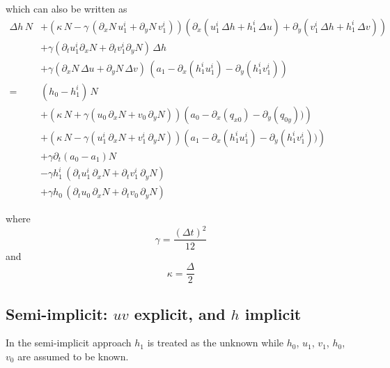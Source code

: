 \documentclass[10pt,a4paper]{book}
\newcommand{\p}{\partial}
\begin{document}
which can also be written as
\begin{align*}
\Delta h  \, N &+ 
\left (\kappa \,N - \gamma \,(\p_x N \, u^i_1    +\p_y N \, v^i_1 ) \right ) 
\left ( \p_x(u^i_1 \, \Delta h  + h^i_1 \,\Delta u ) + \p_y (v^i_1 \, \Delta h  + h^i_1 \,\Delta v ) \right ) \\
&+ \gamma (\p_t u^i_1 \p_x N +\p_t v^i_1 \p_y N ) \, \Delta h  \\
&+  \gamma (\p_x N \, \Delta u+\p_y N \, \Delta v) \, (a_1- \p_x (h^i_1 u^i_1) -\p_y (h^i_1 v^i_1))  \\
=&  ( h_0-h^i_1) \, N \\
&+ \left (\kappa \, N+ \gamma(u_0 \, \p_x N + v_0 \, \p_y N) \right )   \left ( a_0 -\p_x(q_{x0})- \p_y(q_{0y}))  \right ) \\
&+ \left (\kappa\, N-\gamma (u^i_1 \, \p_x N + v^i_1 \, \p_y N) \right ) \left ( a_1 -\p_x(h^i_1 u^i_1) -\p_y(h^i_1 v^i_1))  \right ) \\
&+ \gamma \p_t (a_0-a_1) N \\
&- \gamma h^i_1 \, (\p_t u^i_1 \, \p_x N + \p_t v^i_1 \, \p_y N)  \\
&+ \gamma h_0   \,  (\p_t u_0   \, \p_x N + \p_t v_0 \, \p_y N) 
\end{align*}


where
\[
\gamma=\frac{(\Delta t)^2}{12} 
\]
and
\[
\kappa=\frac{\Delta}{2}
\]




\subsection{Semi-implicit: $uv$ explicit, and $h$ implicit}
In the semi-implicit approach $h_1$ is treated as the unknown while
$h_0$, $u_1$, $v_1$, $h_0$, $v_0$ are assumed to be known.  
\end{document}
